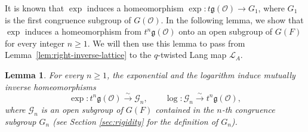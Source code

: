 \documentclass[11pt]{amsart}
\numberwithin{equation}{section}
\newtheorem{lemma}[lemma]{Lemma}
\theoremstyle{definition}
\theoremstyle{remark}
\begin{document}
It is known that $\exp$ induces a homeomorphism $\exp:t\mathfrak{g}(\mathcal{O})\rightarrow G_{1}$, where $G_1$ is the first congruence subgroup of $G(\mathcal{O})$. In the following lemma, we show that $\exp$ induces a homeomorphism from $t^{n}\mathfrak{g}(\mathcal{O})$ onto an open subgroup of $G(F)$ for every integer $n\geq1$. We will then use this lemma to pass from Lemma~\ref{lem:right-inverse-lattice} to the $q$-twisted Lang map $\mathcal{L}_A$.
\begin{lemma}\label{lem:formal-coordinates}
For every $n\geq 1$, the
exponential and the logarithm induce mutually inverse homeomorphisms
\[
\exp:t^n\mathfrak{g}(\mathcal{O})\xrightarrow{\sim}\mathcal G_n,
  \qquad
  \log:\mathcal G_n\xrightarrow{\sim}t^n\mathfrak{g}(\mathcal{O}),
\]
where $\mathcal G_n$ is an open subgroup of $G(F)$ contained in the
$n$-th congruence subgroup $G_n$ (see Section \ref{sec:rigidity} for the definition of $G_n$). 
\end{lemma}
\end{document}
